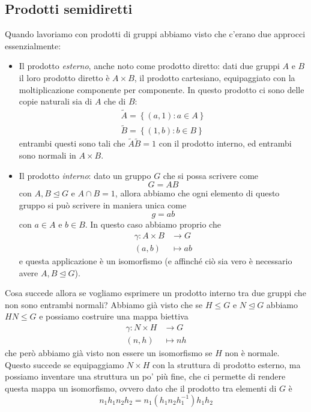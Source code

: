 \documentclass[11pt]{scrartcl}
\newcommand{\normal}{\mathrel{\unlhd}}
\begin{document}
	 \subsection{Prodotti semidiretti}
	 
	 Quando lavoriamo con prodotti di gruppi abbiamo visto che c'erano due approcci essenzialmente:
	 \begin{itemize}
	 	\item Il prodotto \textit{esterno}, anche noto come prodotto diretto: dati due gruppi $A$ e $B$ il loro prodotto diretto è $A\times B$, il prodotto cartesiano, equipaggiato con la moltiplicazione componente per componente. In questo prodotto ci sono delle copie naturali sia di $A$ che di $B$:
	 	\begin{gather*}
	 		\tilde{A}=\left\{\left(a,1\right):a\in A\right\} \\
	 		\tilde{B}=\left\{\left(1,b\right):b\in B\right\}
	 	\end{gather*}
	 	entrambi questi sono tali che $\tilde{A}\tilde{B}=1$ con il prodotto interno, ed entrambi sono normali in $A\times B$.
	 	\item Il prodotto \textit{interno}: dato un gruppo $G$ che si possa scrivere come 
	 	$$G=AB$$
	 	con $A,B\normal G$ e $A\cap B=1$, allora abbiamo che ogni elemento di questo gruppo si può scrivere in maniera unica come 
	 	$$g=ab$$
	 	con $a\in A$ e $b\in B$. In questo caso abbiamo proprio che
	 	\begin{align*}
	 		\gamma: A\times B & \to G \\
	 		\left(a,b\right) & \mapsto ab
	 	\end{align*}
	 	e questa applicazione è un isomorfismo (e affinché ciò sia vero è necessario avere $A,B\normal G$).
 	\end{itemize}
 	Cosa succede allora se vogliamo esprimere un prodotto interno tra due gruppi che non sono entrambi normali? Abbiamo già visto che se $H\le G$ e $N\normal G$ abbiamo $HN\le G$ e possiamo costruire una mappa biettiva
 	\begin{align*}
 		\gamma:N\times H & \to G \\
 		(n,h) & \mapsto nh
 	\end{align*}
 	che però abbiamo già visto non essere un isomorfismo se $H$ non è normale. Questo succede se equipaggiamo $N\times H$ con la struttura di prodotto esterno, ma possiamo inventare una struttura un po' più fine, che ci permette di rendere questa mappa un isomorfismo, ovvero dato che il prodotto tra elementi di $G$ è
 	$$n_1h_1n_2h_2=n_1(h_1n_2h_1^{-1})h_1h_2$$
\end{document}
